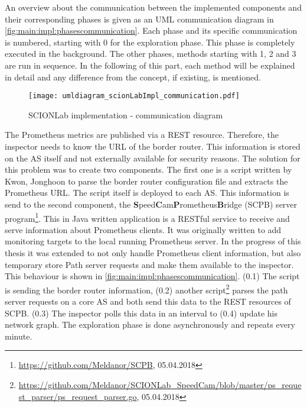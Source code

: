 \documentclass[thesis.tex]{subfiles}
\begin{document}
An overview about the communication between the implemented components and their corresponding phases is given as an UML communication diagram in \autoref{fig:main:impl:phasescommunication}. Each phase and its specific communication is numbered, starting with 0 for the exploration phase. This phase is completely executed in the background. The other phases, methods starting with 1, 2 and 3 are run in sequence. In the following of this part, each method will be explained in detail and any difference from the concept, if existing, is mentioned.

\begin{figure}
	\centering
	\texttt{[image: umldiagram\_scionLabImpl\_communication.pdf]}
	\caption{SCIONLab implementation - communication diagram}
	\label{fig:main:impl:phasescommunication}
\end{figure}

The Prometheus metrics are published via a REST resource. Therefore, the inspector needs to know the URL of the border router. This information is stored on the AS itself and not externally available for security reasons. The solution for this problem was to create two components. The first one is a script written by Kwon, Jonghoon to parse the border router configuration file and extracts the Prometheus URL. The script itself is deployed to each AS. This information is send to the second component, the \textbf{S}peed\textbf{C}am\textbf{P}rometheus\textbf{B}ridge (SCPB) server program\footnote{\url{https://github.com/Meldanor/SCPB}, 05.04.2018}. This in Java written application is a RESTful service to receive and serve information about Prometheus clients. It was originally written to add monitoring targets to the local running Prometheus server. In the progress of this thesis it was extended to not only handle Prometheus client information, but also temporary store Path server requests and make them available to the inspector. This behaviour is shown in \autoref{fig:main:impl:phasescommunication}.
(0.1) The script is sending the border router information, (0.2) another script\footnote{\url{https://github.com/Meldanor/SCIONLab_SpeedCam/blob/master/ps_request_parser/ps_request_parser.go}, 05.04.2018} parses the path server requests on a core AS and both send this data to the REST resources of SCPB. (0.3) The inspector polls this data in an interval to (0.4) update his network graph. The exploration phase is done asynchronously and repeats every minute.
\end{document}

